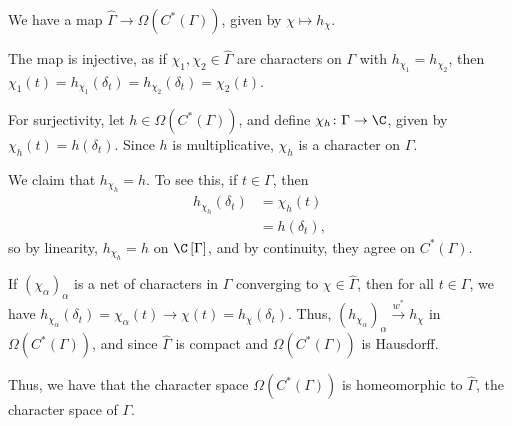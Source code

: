 \documentclass[10pt]{mypackage}
\begin{document}
\begin{example}
  We have a map $\widehat{\Gamma}\rightarrow \Omega\left(C^{\ast}\left(\Gamma\right)\right)$, given by $\chi\mapsto h_{\chi}$.\newline

  The map is injective, as if $\chi_1,\chi_2\in \widehat{\Gamma}$ are characters on $\Gamma$ with $h_{\chi_1} = h_{\chi_2}$, then $\chi_1\left(t\right) = h_{\chi_1}\left(\delta_t\right) = h_{\chi_2}\left(\delta_t\right) = \chi_2\left(t\right)$.\newline

  For surjectivity, let $h\in \Omega\left(C^{\ast}\left(\Gamma\right)\right)$, and define $\chi_h\colon \Gamma\rightarrow \C$, given by $\chi_h\left(t\right) = h\left(\delta_t\right)$. Since $h$ is multiplicative, $\chi_h$ is a character on $\Gamma$.\newline

  We claim that $h_{\chi_h} = h$. To see this, if $t\in \Gamma$, then
  \begin{align*}
    h_{\chi_h}\left(\delta_t\right) &= \chi_h\left(t\right)\\
                                    &= h\left(\delta_t\right),
  \end{align*}
  so by linearity, $h_{\chi_h} = h$ on $\C\left[\Gamma\right]$, and by continuity, they agree on $C^{\ast}\left(\Gamma\right)$.\newline

  If $\left(\chi_{\alpha}\right)_{\alpha}$ is a net of characters in $\Gamma$ converging to $\chi\in \widehat{\Gamma}$, then for all $t\in \Gamma$, we have $h_{\chi_{\alpha}}\left(\delta_t\right) = \chi_{\alpha}\left(t\right) \rightarrow \chi\left(t\right) = h_{\chi}\left(\delta_t\right)$. Thus, $\left(h_{\chi_{\alpha}}\right)_{\alpha}\xrightarrow{w^{\ast}}h_{\chi}$ in $\Omega\left(C^{\ast}\left(\Gamma\right)\right)$, and since $\widehat{\Gamma}$ is compact and $\Omega\left(C^{\ast}\left(\Gamma\right)\right)$ is Hausdorff.\newline

  Thus, we have that the character space $\Omega\left(C^{\ast}\left(\Gamma\right)\right)$ is homeomorphic to $\widehat{\Gamma}$, the character space of $\Gamma$.
\end{example}
\end{document}
